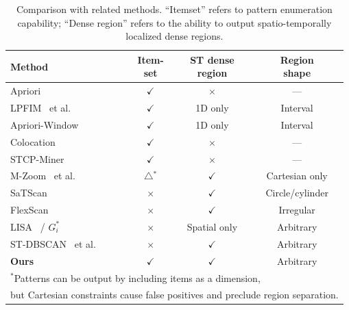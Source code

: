 \begin{table}[t]
\centering
\caption{Comparison with related methods.
``Itemset'' refers to pattern enumeration capability;
``Dense region'' refers to the ability to output
spatio-temporally localized dense regions.}
\label{tab:related}
\small
\begin{tabular}{lccc}
\toprule
Method & \shortstack{Item-\\set} & \shortstack{ST dense\\region} & \shortstack{Region\\shape} \\
\midrule
Apriori~\cite{agrawal1994apriori}
                                          & $\checkmark$ & $\times$     & ---          \\
LPFIM~\cite{mahanta2005lpfim} et al.
                                          & $\checkmark$ & 1D only      & Interval     \\
Apriori-Window~\cite{aprioriwindow}       & $\checkmark$ & 1D only      & Interval     \\
Colocation~\cite{shekhar2001colocation}
                                          & $\checkmark$ & $\times$     & ---          \\
STCP-Miner~\cite{qian2009stcolocation}   & $\checkmark$ & $\times$     & ---          \\
\midrule
M-Zoom~\cite{shin2018mzoom} et al.       & $\triangle$$^*$     & $\checkmark$ & Cartesian only \\
SaTScan~\cite{kulldorff1997spatial}       & $\times$     & $\checkmark$ & Circle/cylinder \\
FlexScan~\cite{tango2005flexscan}        & $\times$     & $\checkmark$ & Irregular    \\
LISA~\cite{anselin1995lisa}
  / $G_i^*$~\cite{ord1995getis}          & $\times$     & Spatial only & Arbitrary    \\
ST-DBSCAN~\cite{birant2007stdbscan} et al. & $\times$   & $\checkmark$ & Arbitrary    \\
\midrule
\textbf{Ours}                              & $\checkmark$ & $\checkmark$ & Arbitrary    \\
\bottomrule
\multicolumn{4}{l}{\scriptsize $^*$Patterns can be output by including items as a dimension,} \\
\multicolumn{4}{l}{\scriptsize \hspace{1em}but Cartesian constraints cause false positives and preclude region separation.}
\end{tabular}
\end{table}
